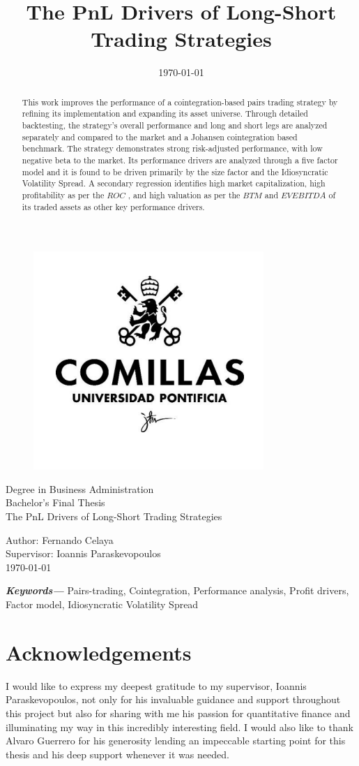 \documentclass[12pt,a4paper,twoside]{article}
\title{The PnL Drivers of Long-Short Trading Strategies}
\date{\today}
\providecommand{\keywords}[1]
{
  \small	
  \textbf{\textit{Keywords---}} #1
}
\begin{document}
\pagestyle{empty}
\begin{titlepage}
  \begin{figure}
    \centering
    \includegraphics[width=0.3\linewidth]{assets/logo-comillas.png}
  \end{figure}
  \centering
  \Large 
  Degree in Business Administration \\ Bachelor's Final Thesis\\[36px]
  \Huge 
  The PnL Drivers of Long-Short Trading Strategies\\
  \Large
  \raggedright
  \vspace*{\fill}
  Author: Fernando Celaya\\
  Supervisor: Ioannis Paraskevopoulos\\
  \today

\end{titlepage}
\newpage

\begin{abstract}
  This work improves the performance of a cointegration-based pairs trading strategy by refining its implementation and expanding its asset universe. Through detailed backtesting, the strategy's overall performance and long and short legs are analyzed separately and compared to the market and a Johansen cointegration based benchmark. The strategy demonstrates strong risk-adjusted performance, with low negative beta to the market. Its performance drivers are analyzed through a five factor model and it is found to be driven primarily by the size factor and the Idiosyncratic Volatility Spread. A secondary regression identifies high market capitalization, high profitability as per the $ROC$ , and high valuation as per the $BTM$ and $EVEBITDA$ of its traded assets as other key performance drivers. 
\end{abstract}
\keywords{Pairs-trading, Cointegration, Performance analysis, Profit drivers, Factor model, Idiosyncratic Volatility Spread}
\newpage

\section*{Acknowledgements}
I would like to express my deepest gratitude to my supervisor, Ioannis Paraskevopoulos, not only for his invaluable guidance and support throughout this project but also for sharing with me his passion for quantitative finance and illuminating my way in this incredibly interesting field. I would also like to thank Alvaro Guerrero for his generosity lending an impeccable starting point for this thesis and his deep support whenever it was needed. 
\newpage
\end{document}
